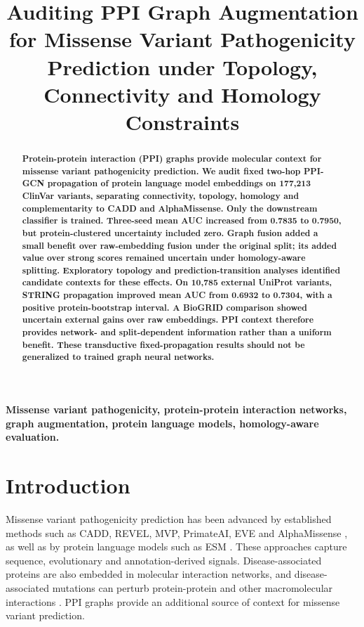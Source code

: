 \documentclass[conference]{IEEEtran}
\title{Auditing PPI Graph Augmentation for Missense Variant Pathogenicity Prediction under Topology, Connectivity and Homology Constraints}
\author{}
\begin{document}
\maketitle


\begin{abstract}
\bfseries\boldmath
Protein-protein interaction (PPI) graphs provide molecular context for missense variant pathogenicity prediction. We audit fixed two-hop PPI-GCN propagation of protein language model embeddings on 177,213 ClinVar variants, separating connectivity, topology, homology and complementarity to CADD and AlphaMissense. Only the downstream classifier is trained. Three-seed mean AUC increased from 0.7835 to 0.7950, but protein-clustered uncertainty included zero. Graph fusion added a small benefit over raw-embedding fusion under the original split; its added value over strong scores remained uncertain under homology-aware splitting. Exploratory topology and prediction-transition analyses identified candidate contexts for these effects. On 10,785 external UniProt variants, STRING propagation improved mean AUC from 0.6932 to 0.7304, with a positive protein-bootstrap interval. A BioGRID comparison showed uncertain external gains over raw embeddings. PPI context therefore provides network- and split-dependent information rather than a uniform benefit. These transductive fixed-propagation results should not be generalized to trained graph neural networks.

\end{abstract}

\begin{IEEEkeywords}
\bfseries\boldmath
Missense variant pathogenicity, protein-protein interaction networks, graph augmentation, protein language models, homology-aware evaluation.
\end{IEEEkeywords}

\section{Introduction}

Missense variant pathogenicity prediction has been advanced by established methods such as CADD, REVEL, MVP, PrimateAI, EVE and AlphaMissense \cite{Kircher2014CADD,Ioannidis2016REVEL,Qi2021MVP,Sundaram2018PrimateAI,Frazer2021EVE,Cheng2023AlphaMissense}, as well as by protein language models such as ESM \cite{Lin2023ESM}. These approaches capture sequence, evolutionary and annotation-derived signals. Disease-associated proteins are also embedded in molecular interaction networks, and disease-associated mutations can perturb protein-protein and other macromolecular interactions \cite{Barabasi2011NetworkMedicine,Menche2015DiseaseModules,Sahni2015InteractionPerturbation,Chen2018InteractomePerturbation}. PPI graphs provide an additional source of context for missense variant prediction.
\end{document}
